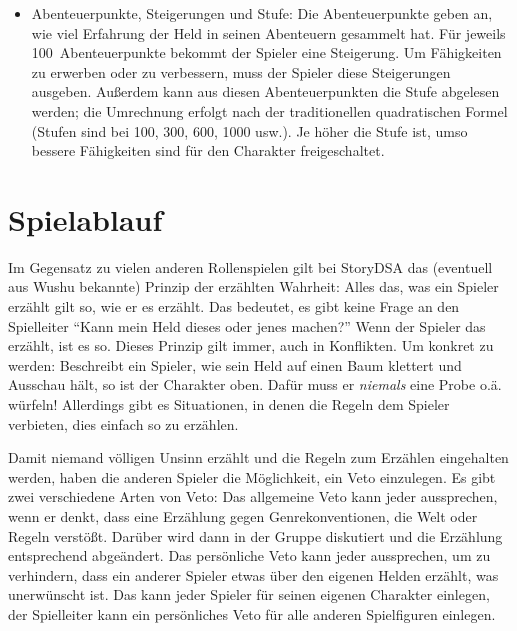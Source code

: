 \begin{itemize}
\item Abenteuerpunkte, Steigerungen und Stufe: Die Abenteuerpunkte geben an, wie viel Erfahrung der Held in seinen Abenteuern gesammelt hat. Für jeweils 100~Abenteuerpunkte bekommt der Spieler eine Steigerung. Um Fähigkeiten zu erwerben oder zu verbessern, muss der Spieler diese Steigerungen ausgeben.
Außerdem kann aus diesen Abenteuerpunkten die Stufe abgelesen werden; die Umrechnung erfolgt nach der traditionellen quadratischen Formel (Stufen sind bei 100, 300, 600, 1000 usw.). Je höher die Stufe ist, umso bessere Fähigkeiten sind für den Charakter freigeschaltet.
\end{itemize}         

\section{Spielablauf}

Im Gegensatz zu vielen anderen Rollenspielen gilt bei StoryDSA das (eventuell aus Wushu bekannte) Prinzip der erzählten Wahrheit: Alles das, was ein Spieler erzählt gilt so, wie er es erzählt. Das bedeutet, es gibt keine Frage an den Spielleiter "`Kann mein Held dieses oder jenes machen?"' Wenn der Spieler das erzählt, ist es so. Dieses Prinzip gilt immer, auch in Konflikten. Um konkret zu werden: Beschreibt ein Spieler, wie sein Held auf einen Baum klettert und Ausschau hält, so ist der Charakter oben. Dafür muss er \emph{niemals} eine Probe o.ä. würfeln! Allerdings gibt es Situationen, in denen die Regeln dem Spieler verbieten, dies einfach so zu erzählen.

Damit niemand völligen Unsinn erzählt und die Regeln zum Erzählen eingehalten werden, haben die anderen Spieler die Möglichkeit, ein Veto einzulegen. Es gibt zwei verschiedene Arten von Veto: Das allgemeine Veto kann jeder aussprechen, wenn er denkt, dass eine Erzählung gegen Genrekonventionen, die Welt oder Regeln verstößt. Darüber wird dann in der Gruppe diskutiert und die Erzählung entsprechend abgeändert. Das persönliche Veto kann jeder aussprechen, um zu verhindern, dass ein anderer Spieler etwas über den eigenen Helden erzählt, was unerwünscht ist. Das kann jeder Spieler für seinen eigenen Charakter einlegen, der Spielleiter kann ein persönliches Veto für alle anderen Spielfiguren einlegen.

